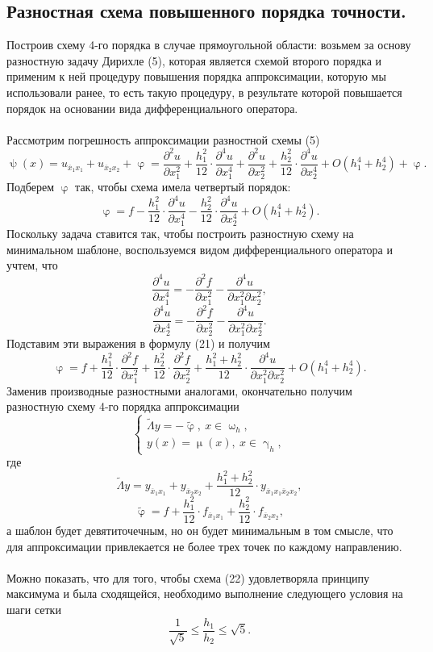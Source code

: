 \documentclass[a4paper, 12pt]{report}
\numberwithin{equation}{section}
\newcommand{\ol}{\overline}
\renewcommand{\leq}{\leqslant}
\renewcommand{\gamma}{\upgamma}
\renewcommand{\varphi}{\upvarphi}
\renewcommand{\psi}{\uppsi}
\renewcommand{\mu}{\upmu}
\renewcommand{\omega}{\upomega}
\renewcommand{\d}{\partial}
\begin{document}
	\subsection{Разностная схема повышенного порядка точности.}
	Построив схему 4-го порядка в случае прямоугольной области: возьмем за основу разностную задачу Дирихле (5), которая является схемой второго порядка и применим к ней процедуру повышения порядка аппроксимации, которую мы использовали ранее, то есть такую процедуру, в результате которой повышается порядок на основании вида дифференциального оператора. \\\\
	Рассмотрим погрешность аппроксимации разностной схемы (5)
	$$\psi(x) =u_{\ol x_1 x_1} + u_{\ol x_2 x_2} + \varphi = \dfrac{\d ^2 u}{\d x_1^2} + \dfrac{h_1^2}{12}\cdot\dfrac{\d ^4 u}{\d x_1^4} + \dfrac{\d ^2 u}{\d x_2^2} + \dfrac{h_2^2}{12}\cdot\dfrac{\d ^4 u}{\d x_2^4} + O(h_1^4 + h_2^4) +\varphi.$$
	Подберем $\varphi$ так, чтобы схема имела четвертый порядок:
	\begin{equation}
		\varphi= f - \dfrac{h_1^2}{12}\cdot\dfrac{\d ^4 u}{\d x_1^4} - \dfrac{h_2^2}{12}\cdot\dfrac{\d ^4 u}{\d x_2^4} + O(h_1^4 + h_2^4).
	\end{equation}
	Поскольку задача ставится так, чтобы построить разностную схему на минимальном шаблоне, воспользуемся видом дифференциального оператора и учтем, что
	$$\dfrac{\d ^4 u}{\d x_1^4} = -\dfrac{\d ^2 f}{\d x_1^2} - \dfrac{\d ^4 u}{\d x_1^2 \d x_2^2},$$
	$$\dfrac{\d ^4 u}{\d x_2^4} = -\dfrac{\d ^2 f}{\d x_2^2} - \dfrac{\d ^4 u}{\d x_1^2 \d x_2^2}.$$
	Подставим эти выражения в формулу (21) и получим
	$$\varphi = f + \dfrac{h_1^2}{12}\cdot \dfrac{\d ^2 f}{\d x_1^2} +\dfrac{h_2^2}{12}\cdot \dfrac{\d ^2 f}{\d x_2^2} + \dfrac{h_1^2 + h_2^2}{12}\cdot \dfrac{\d ^4 u}{\d x_1^2 \d x_2^2} + O(h_1^4 + h_2^4).$$
	Заменив производные разностными аналогами, окончательно получим разностную схему 4-го порядка аппроксимации
	\begin{equation}
		\begin{cases}
			\tilde \Lambda y = - \tilde \varphi,\ x \in \omega_h,\\
			y(x) = \mu(x),\ x \in \gamma_h, 
		\end{cases}
	\end{equation}
	где $$\tilde \Lambda y = y_{\ol x_1 x_1} + y_{\ol x_2 x_2} + \dfrac{h_1^2 + h_2^2}{12}\cdot y_{\ol x_1 x_1 \ol x_2 x_2},$$
	$$\tilde \varphi = f + \dfrac{h_1^2}{12}\cdot f_{\ol x_1 x_1} + \dfrac{h_2^2}{12}\cdot f_{\ol x_2 x_2},$$
	а шаблон будет девятиточечным, но он будет минимальным в том смысле, что для аппроксимации привлекается не более трех точек по каждому направлению.\\\\
	Можно показать, что для того, чтобы схема (22) удовлетворяла принципу максимума и была сходящейся, необходимо выполнение следующего условия на шаги сетки
	\begin{equation}
		\dfrac{1}{\sqrt 5} \leq \dfrac{h_1}{h_2} \leq \sqrt{5}.
	\end{equation}
\end{document}
